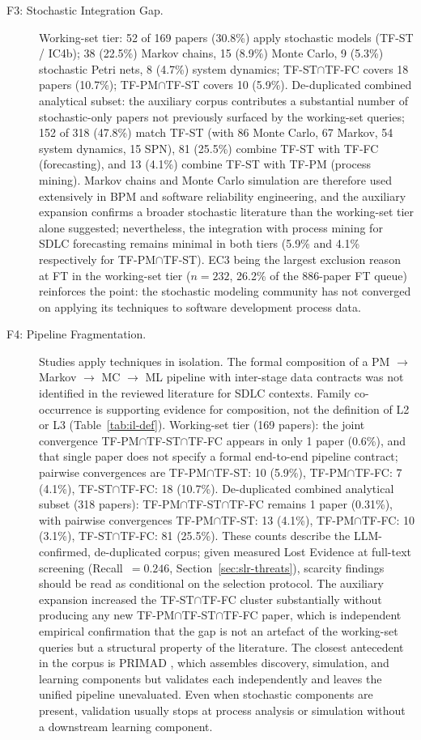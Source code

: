 \begin{description}
\item[F3: Stochastic Integration Gap.]
Working-set tier: 52 of 169 papers (30.8\%) apply stochastic models
(TF-ST / IC4b); 38 (22.5\%) Markov chains, 15 (8.9\%) Monte Carlo, 9 (5.3\%)
stochastic Petri nets, 8 (4.7\%) system dynamics; TF-ST$\cap$TF-FC covers 18
papers (10.7\%); TF-PM$\cap$TF-ST covers 10 (5.9\%). De-duplicated combined
analytical subset: the
auxiliary corpus contributes a substantial number of stochastic-only papers
not previously surfaced by the working-set queries; 152 of 318 (47.8\%)
match TF-ST (with 86 Monte Carlo, 67 Markov, 54 system dynamics, 15 SPN), 81
(25.5\%) combine TF-ST with TF-FC (forecasting), and 13 (4.1\%) combine TF-ST
with TF-PM (process mining). Markov chains and Monte Carlo simulation are
therefore used extensively in BPM and software reliability engineering, and
the auxiliary expansion confirms a broader stochastic literature than the
working-set tier alone suggested; nevertheless, the integration with process
mining for SDLC forecasting remains minimal in both tiers (5.9\% and 4.1\%
respectively for TF-PM$\cap$TF-ST). EC3 being the largest exclusion reason at
FT in the working-set tier ($n=232$, 26.2\% of the 886-paper FT queue)
reinforces the point: the stochastic modeling community has not converged
on applying its techniques to software development process data.

\item[F4: Pipeline Fragmentation.]
Studies apply techniques in isolation. The formal composition of a
PM $\rightarrow$ Markov $\rightarrow$ MC $\rightarrow$ ML pipeline with
inter-stage data contracts was not identified in the reviewed literature for
SDLC contexts. Family co-occurrence is supporting evidence for composition,
not the definition of L2 or L3 (Table~\ref{tab:il-def}).
Working-set tier (169 papers): the joint convergence
TF-PM$\cap$TF-ST$\cap$TF-FC appears in only 1 paper (0.6\%), and that single
paper does not specify a formal end-to-end pipeline contract; pairwise
convergences are TF-PM$\cap$TF-ST: 10 (5.9\%), TF-PM$\cap$TF-FC: 7 (4.1\%),
TF-ST$\cap$TF-FC: 18 (10.7\%). De-duplicated combined analytical subset (318 papers): TF-PM$\cap$TF-ST$\cap$TF-FC
remains 1 paper (0.31\%), with pairwise convergences TF-PM$\cap$TF-ST: 13
(4.1\%), TF-PM$\cap$TF-FC: 10 (3.1\%), TF-ST$\cap$TF-FC: 81 (25.5\%). These
counts describe the LLM-confirmed, de-duplicated corpus; given measured Lost
Evidence at full-text screening (Recall~$= 0.246$, Section~\ref{sec:slr-threats}),
scarcity findings should be read as conditional on the selection protocol.
The auxiliary expansion increased the TF-ST$\cap$TF-FC cluster substantially without
producing any new TF-PM$\cap$TF-ST$\cap$TF-FC paper, which is independent
empirical confirmation that the gap is not an artefact of the working-set
queries but a structural property of the literature. The closest antecedent
in the corpus is PRIMAD \cite{guinea2025}, which assembles discovery,
simulation, and learning components but validates each independently and
leaves the unified pipeline unevaluated. Even when stochastic components are
present, validation usually stops at process analysis or simulation without
a downstream learning component.


\end{description}
